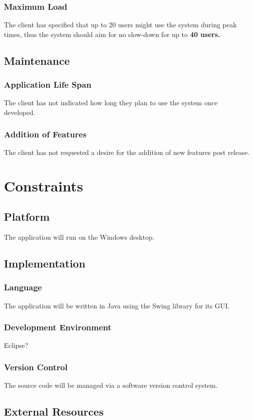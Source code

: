 \documentclass{article}
\begin{document}
\subsubsection{Maximum Load}
The client has specified that up to 20 users might use the system during
peak times, thus the system should aim for no slow-down for up to \textbf{40 users.}
\subsection{Maintenance}
\subsubsection{Application Life Span}
The client has not indicated how long they plan to use the system once developed.
\subsubsection{Addition of Features}
The client has not requested a desire for the addition of new
features post release.

\section{Constraints}
\subsection{Platform}
The application will run on the Windows desktop.
\subsection{Implementation}
\subsubsection{Language}
The application will be written in Java using the Swing library for its GUI.
\subsubsection{Development Environment}
Eclipse?
\subsubsection{Version Control}
The source code will be managed via a software version control system.
\subsection{External Resources}
\end{document}
